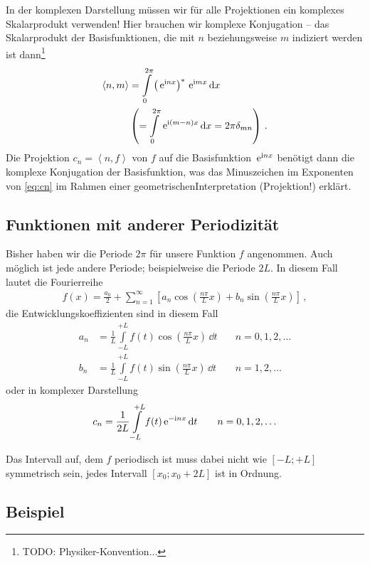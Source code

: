 \documentclass[paper=a4, fontsize=11.0pt, abstractoff, DIV12]{scrartcl}
\begin{document}
\Stopsign\hspace{1ex}In der komplexen Darstellung müssen wir für alle
Projektionen ein komplexes Skalarprodukt verwenden! Hier brauchen wir
komplexe Konjugation -- das Skalarprodukt der Basisfunktionen, die mit $n$
beziehungsweise $m$ indiziert werden ist dann\footnote{TODO: Physiker-Konvention...}
\begin{align}
\left<n,m\right> &= \int\limits_{0}^{2\pi}\left(\,{\mathrm{e}}^{\mathrm{i} nx}\right)^*\,{\mathrm{e}}^{\mathrm{i} mx} \,\mathrm{d} x\\
& \left( =  \int\limits_{0}^{2\pi} \,{\mathrm{e}}^{\mathrm{i} (m-n)x}\,\mathrm{d} x = 2\pi \delta_{mn}\right)\,.\nonumber
\end{align}
Die Projektion $c_n = \left<n,f\right>$ von $f$ auf die Basisfunktion
$\,{\mathrm{e}}^{\mathrm{i} n x}$ benötigt dann die komplexe Konjugation der Basisfunktion,
was das Minuszeichen im Exponenten von \eqref{eq:cn} im Rahmen einer
\glqq geometrischen\grqq Interpretation (Projektion!) erklärt.

\subsection{Funktionen mit anderer Periodizität}

Bisher haben wir die Periode $2\pi$ für unsere Funktion $f$ angenommen. Auch
möglich ist jede andere Periode; beispielweise die Periode $2L$. In diesem Fall
lautet die Fourierreihe
\begin{align}
f(x) = \frac{a_0}{2} + \sum\limits_{n=1}^{\infty}\left[a_n \cos\left(\frac{n\pi}{L}x\right) + b_n \sin\left(\frac{n\pi}{L}x\right)\right]\,,
\end{align}
die Entwicklungskoeffizienten sind in diesem Fall
\begin{align}
a_n &= \frac{1}{L}\int\limits_{-L}^{+L} f(t) \cos\left(\frac{n\pi}{L}x\right)\,\dd t\quad&n=0,1,2,\dots\\
b_n &= \frac{1}{L}\int\limits_{-L}^{+L} f(t) \sin\left(\frac{n\pi}{L}x\right)\,\dd t\quad&n=1,2,\dots
\end{align}
oder in komplexer Darstellung
\begin{align}
c_n = \frac{1}{2L}\int\limits_{-L}^{+L} f(t) \,{\mathrm{e}}^{-\mathrm{i} n x}\,\mathrm{d} t\qquad&n=0,1,2,\dots\\
\end{align}

Das Intervall auf, dem $f$ periodisch ist muss dabei nicht wie $[-L;+L]$
symmetrisch sein, jedes Intervall $[x_0; x_0+2L]$ ist in Ordnung.

\subsection{Beispiel}
\end{document}
